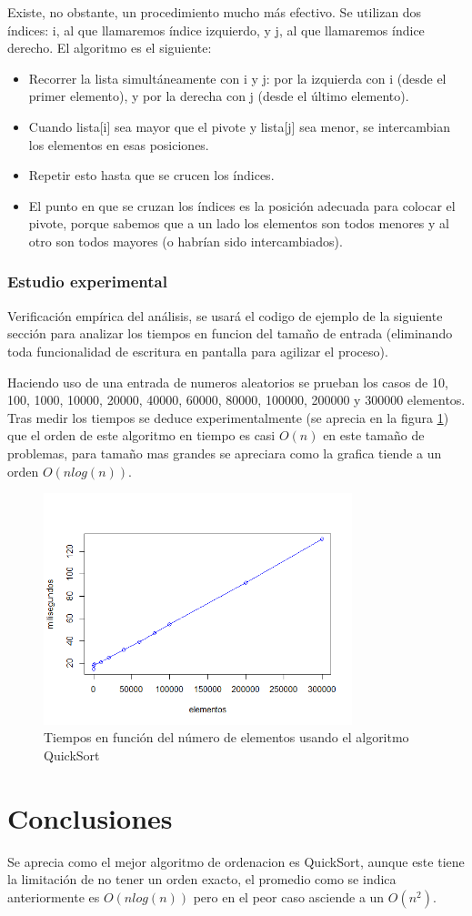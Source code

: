 \documentclass[8pt, A4]{article}    %
\begin{document}
Existe, no obstante, un procedimiento mucho más efectivo. Se utilizan dos índices: i, al que llamaremos índice izquierdo, y j, al que llamaremos índice derecho. El algoritmo es el siguiente:
\begin{itemize}
    \item Recorrer la lista simultáneamente con i y j: por la izquierda con i (desde el primer elemento), y por la derecha con j (desde el último elemento).
    \item Cuando lista[i] sea mayor que el pivote y lista[j] sea menor, se intercambian los elementos en esas posiciones.
    \item Repetir esto hasta que se crucen los índices.
    \item El punto en que se cruzan los índices es la posición adecuada para colocar el pivote, porque sabemos que a un lado los elementos son todos menores y al otro son todos mayores (o habrían sido intercambiados).
\end{itemize}

\newpage

\subsubsection{Estudio experimental}
Verificación empírica del análisis, se usará el codigo de ejemplo de la siguiente sección para analizar los tiempos en funcion del tamaño de entrada (eliminando toda funcionalidad de escritura en pantalla para agilizar el proceso).

Haciendo uso de una entrada de numeros aleatorios se prueban los casos de 10, 100, 1000, 10000, 20000, 40000, 60000, 80000, 100000, 200000 y 300000 elementos.
Tras medir los tiempos se deduce experimentalmente (se aprecia en la figura \ref{fig:quicksortTime}) que el orden de este algoritmo en tiempo es casi $O(n)$ en este tamaño de problemas, para tamaño mas grandes se apreciara como la grafica tiende a un orden  $O(nlog(n))$.

\begin{figure}[h]
\begin{center}
\includegraphics[width=0.8\textwidth]{graph/quicksortTime}
\end{center}
\caption{Tiempos en función del número de elementos usando el algoritmo QuickSort}
\label{fig:quicksortTime}
\end{figure}


\section{Conclusiones}
Se aprecia como el mejor algoritmo de ordenacion es QuickSort, aunque este tiene la limitación de no tener un orden exacto, el promedio como se indica anteriormente es $O(nlog(n))$ pero en el peor caso asciende a un  $O(n^2)$.
\end{document}
